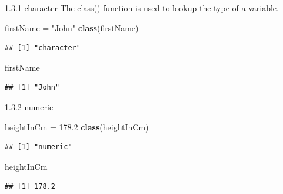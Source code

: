 \documentclass[
  ignorenonframetext,
]{beamer}
\newenvironment{Shaded}{\begin{snugshade}}{\end{snugshade}}
\newcommand{\FloatTok}[1]{\textcolor[rgb]{0.00,0.00,0.81}{#1}}
\newcommand{\FunctionTok}[1]{\textcolor[rgb]{0.13,0.29,0.53}{\textbf{#1}}}
\newcommand{\NormalTok}[1]{#1}
\newcommand{\OtherTok}[1]{\textcolor[rgb]{0.56,0.35,0.01}{#1}}
\newcommand{\StringTok}[1]{\textcolor[rgb]{0.31,0.60,0.02}{#1}}
\begin{document}
\begin{frame}[fragile]{1.3.1 character}
\protect\hypertarget{character}{}
The class() function is used to lookup the type of a variable.

\begin{Shaded}
\begin{Highlighting}[]
\NormalTok{firstName }\OtherTok{=} \StringTok{"John"}
\FunctionTok{class}\NormalTok{(firstName)}
\end{Highlighting}
\end{Shaded}

\begin{verbatim}
## [1] "character"
\end{verbatim}

\begin{Shaded}
\begin{Highlighting}[]
\NormalTok{firstName}
\end{Highlighting}
\end{Shaded}

\begin{verbatim}
## [1] "John"
\end{verbatim}
\end{frame}

\begin{frame}[fragile]{1.3.2 numeric}
\protect\hypertarget{numeric}{}
\begin{Shaded}
\begin{Highlighting}[]
\NormalTok{heightInCm }\OtherTok{=} \FloatTok{178.2}
\FunctionTok{class}\NormalTok{(heightInCm)}
\end{Highlighting}
\end{Shaded}

\begin{verbatim}
## [1] "numeric"
\end{verbatim}

\begin{Shaded}
\begin{Highlighting}[]
\NormalTok{heightInCm}
\end{Highlighting}
\end{Shaded}

\begin{verbatim}
## [1] 178.2
\end{verbatim}
\end{frame}
\end{document}

